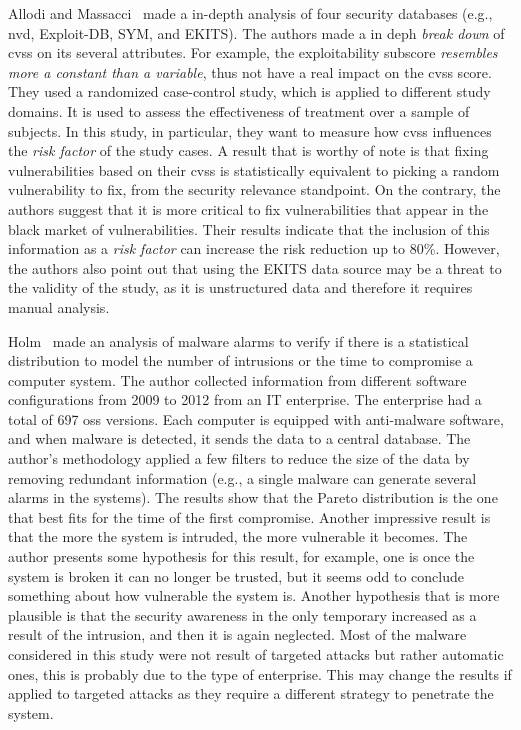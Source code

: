 Allodi and Massacci~\cite{Allodi:2014} made a in-depth analysis of four security databases (e.g., \gls{nvd}, Exploit-DB, SYM, and EKITS). 
The authors made a in deph \emph{break down} of \gls{cvss} on its several attributes.
For example, the exploitability subscore \emph{resembles more a constant than a variable}, thus not have a real impact on the \gls{cvss} score.
They used a randomized case-control study, which is applied to different study domains.
It is used to assess the effectiveness of treatment over a sample of subjects.
In this study, in particular, they want to measure how \gls{cvss} influences the \emph{risk factor} of the study cases.
A result that is worthy of note is that fixing vulnerabilities based on their \gls{cvss} is statistically equivalent to picking a random vulnerability to fix, from the security relevance standpoint.
On the contrary, the authors suggest that it is more critical to fix vulnerabilities that appear in the black market of vulnerabilities.
Their results indicate that the inclusion of this information as a \emph{risk factor} can increase the risk reduction up to 80\%.
However, the authors also point out that using the EKITS data source may be a threat to the validity of the study, as it is unstructured data and therefore it requires manual analysis.



Holm~\cite{Holm:2014} made an analysis of malware alarms to verify if there is a statistical distribution to model the number of intrusions or the time to compromise a computer system.
The author collected information from different software configurations from 2009 to 2012 from an IT enterprise.
The enterprise had a total of 697 \glspl{os} versions.
Each computer is equipped with anti-malware software, and when malware is detected, it sends the data to a central database.
The author's methodology applied a few filters to reduce the size of the data by removing redundant information (e.g., a single malware can generate several alarms in the systems).
The results show that the Pareto distribution is the one that best fits for the time of the first compromise.
Another impressive result is that the more the system is intruded, the more vulnerable it becomes. 
The author presents some hypothesis for this result, for example, one is once the system is broken it can no longer be trusted, but it seems odd to conclude something about how vulnerable the system is. 
Another hypothesis that is more plausible is that the security awareness in the only temporary increased as a result of the intrusion, and then it is again neglected.
Most of the malware considered in this study were not result of targeted attacks but rather automatic ones, this is probably due to the type of enterprise. 
This may change the results if applied to targeted attacks as they require a different strategy to penetrate the system.


